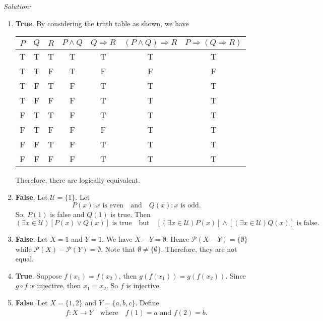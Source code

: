 \documentclass[12pt]{article}
\begin{document}
\newpage
\noindent\emph{Solution:}
\begin{enumerate}[label=\textbf{(\alph*)}]
\itemsep 0em
    \item \textbf{True}. By considering the truth table as shown, we have
    
    \begin{table}[h!]
        \centering
        \begin{tabular}{|c|c|c|c|c|c|c|} \hline 
            $P$ & $Q$ & $R$ & $P\land Q$ & $Q\Rightarrow R$ & $(P\land Q)\Rightarrow R$ & $P\Rightarrow(Q\Rightarrow R)$\\ \hline 
             T&  T&  T&  T&  T&  T& T\\ \hline 
             T&  T&  F&  T&  F&  F& F\\ \hline 
             T&  F&  T&  F&  T&  T& T\\ \hline 
             T&  F&  F&  F&  T&  T& T\\ \hline 
             F&  T&  T&  F&  T&  T& T\\ \hline 
             F&  T&  F&  F&  F&  T& T\\ \hline 
             F&  F&  T&  F&  T&  T& T\\ \hline 
             F&  F&  F&  F&  T&  T& T\\ \hline
        \end{tabular}
    \end{table}
    Therefore, there are logically equivalent.
    \item \textbf{False}. Let $\mathcal{U}=\{1\}$. Let \[P\left(x\right):x\text{ is even}\quad\text{and}\quad Q\left(x\right):x\text{ is odd}.\]
    So, $P(1)$ is false and $Q(1)$ is true. Then \[(\exists x\in\mathcal{U})[P(x)\lor Q(x)]\text{ is true}\quad\text{but}\quad [(\exists x\in\mathcal{U})P(x)]\land[(\exists x\in\mathcal{U})Q(x)]\text{ is false}. \] 
    \item \textbf{False}. Let $X={1}$ and $Y={1}$. We have $X-Y=\emptyset$. Hence $\mathcal{P}(X-Y)=\{\emptyset\}$ while $\mathcal{P}(X)-\mathcal{P}(Y)=\emptyset$. Note that $\emptyset\neq\{\emptyset\}$. Therefore, they are not equal.
    \item \textbf{True}. Suppose $f(x_1)=f(x_2)$, then $g(f(x_1))=g(f(x_2))$. Since $g\circ f$ is injective, then $x_1=x_2$. So $f$ is injective.
    \item \textbf{False}. Let $X=\{1,2\}$ and $Y=\{a,b,c\}$. Define 
    \begin{align*}
        f:X\to Y\quad\text{where}\quad f(1)=a\text{ and } f(2)=b.
    \end{align*}

\end{enumerate}
\end{document}
